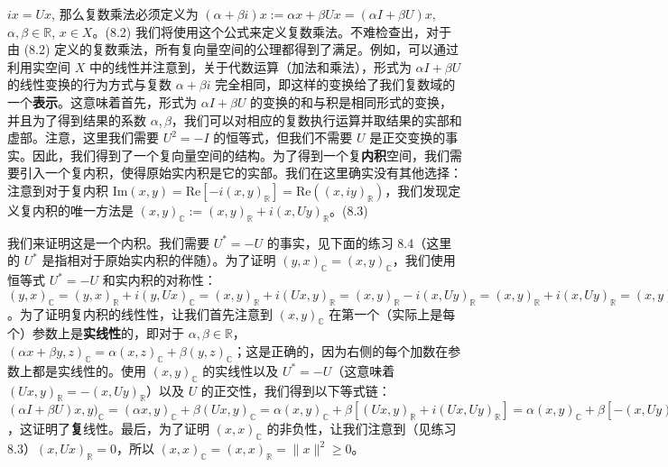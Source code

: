 $i x = U x$, 那么复数乘法必须定义为 $( \alpha + \beta i ) x := \alpha x + \beta U x = (\alpha I + \beta U) x$, $\alpha, \beta \in \mathbb{R}$, $x \in X$。(8.2)
我们将使用这个公式来定义复数乘法。不难检查出，对于由 (8.2) 定义的复数乘法，所有复向量空间的公理都得到了满足。例如，可以通过利用实空间 $X$ 中的线性并注意到，关于代数运算（加法和乘法），形式为 $\alpha I + \beta U$ 的线性变换的行为方式与复数 $\alpha + \beta i$ 完全相同，即这样的变换给了我们复数域的一个\textbf{表示}。这意味着首先，形式为 $\alpha I + \beta U$ 的变换的和与积是相同形式的变换，并且为了得到结果的系数 $\alpha, \beta$，我们可以对相应的复数执行运算并取结果的实部和虚部。注意，这里我们需要 $U^2 = -I$ 的恒等式，但我们不需要 $U$ 是正交变换的事实。因此，我们得到了一个复向量空间的结构。为了得到一个复\textbf{内积}空间，我们需要引入一个复内积，使得原始实内积是它的实部。我们在这里确实没有其他选择：注意到对于复内积 $\text{Im}(x, y) = \text{Re}[-i(x, y)_{\mathbb{R}}] = \text{Re}((x, i y)_{\mathbb{R}})$，我们发现定义复内积的唯一方法是
$(x, y)_{\mathbb{C}} := (x, y)_{\mathbb{R}} + i(x, Uy)_{\mathbb{R}}$。(8.3)

我们来证明这是一个内积。我们需要 $U^* = -U$ 的事实，见下面的练习 8.4（这里的 $U^*$ 是指相对于原始实内积的伴随）。为了证明 $(y, x)_{\mathbb{C}} = (x, y)_{\mathbb{C}}$，我们使用恒等式 $U^* = -U$ 和实内积的对称性：$(y, x)_{\mathbb{C}} = (y, x)_{\mathbb{R}} + i(y, Ux)_{\mathbb{C}} = (x, y)_{\mathbb{R}} + i(Ux, y)_{\mathbb{R}} = (x, y)_{\mathbb{R}} - i(x, Uy)_{\mathbb{R}} = (x, y)_{\mathbb{R}} + i(x, Uy)_{\mathbb{R}} = (x, y)_{\mathbb{C}}$。为了证明复内积的线性性，让我们首先注意到 $(x, y)_{\mathbb{C}}$ 在第一个（实际上是每个）参数上是\textbf{实线性}的，即对于 $\alpha, \beta \in \mathbb{R}$，$( \alpha x + \beta y, z )_{\mathbb{C}} = \alpha (x, z)_{\mathbb{C}} + \beta (y, z)_{\mathbb{C}}$；这是正确的，因为右侧的每个加数在参数上都是实线性的。使用 $(x, y)_{\mathbb{C}}$ 的实线性以及 $U^* = -U$（这意味着 $(Ux, y)_{\mathbb{R}} = -(x, Uy)_{\mathbb{R}}$）以及 $U$ 的正交性，我们得到以下等式链：$(\alpha I + \beta U)x, y)_{\mathbb{C}} = (\alpha x, y)_{\mathbb{C}} + \beta (Ux, y)_{\mathbb{C}} = \alpha (x, y)_{\mathbb{C}} + \beta [(Ux, y)_{\mathbb{R}} + i(Ux, Uy)_{\mathbb{R}}] = \alpha (x, y)_{\mathbb{C}} + \beta [-(x, Uy)_{\mathbb{R}} + i(x, y)_{\mathbb{R}}] = \alpha (x, y)_{\mathbb{C}} + \beta i [(x, y)_{\mathbb{R}} + i(x, Uy)_{\mathbb{R}}] = \alpha (x, y)_{\mathbb{C}} + \beta i (x, y)_{\mathbb{C}} = (\alpha + \beta i)(x, y)_{\mathbb{C}}$，这证明了\textbf{复}线性。最后，为了证明 $(x, x)_{\mathbb{C}}$ 的非负性，让我们注意到（见练习 8.3）$(x, Ux)_{\mathbb{R}} = 0$，所以 $(x, x)_{\mathbb{C}} = (x, x)_{\mathbb{R}} = \|x\|^2 \geq 0$。

